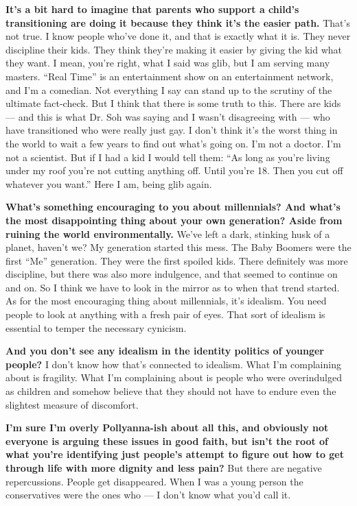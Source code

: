 \textbf{It's a bit hard to imagine that parents who support a child's
transitioning are doing it because they think it's the easier path.}
That's not true. I know people who've done it, and that is exactly what
it is. They never discipline their kids. They think they're making it
easier by giving the kid what they want. I mean, you're right, what I
said was glib, but I am serving many masters. ``Real Time'' is an
entertainment show on an entertainment network, and I'm a comedian. Not
everything I say can stand up to the scrutiny of the ultimate
fact-check. But I think that there is some truth to this. There are kids
--- and this is what Dr. Soh was saying and I wasn't disagreeing with
--- who have transitioned who were really just gay. I don't think it's
the worst thing in the world to wait a few years to find out what's
going on. I'm not a doctor. I'm not a scientist. But if I had a kid I
would tell them: ``As long as you're living under my roof you're not
cutting anything off. Until you're 18. Then you cut off whatever you
want.'' Here I am, being glib again.

\textbf{What's something encouraging to you about millennials? And
what's the most disappointing thing about your own generation? Aside
from ruining the world environmentally.} We've left a dark, stinking
husk of a planet, haven't we? My generation started this mess. The Baby
Boomers were the first ``Me'' generation. They were the first spoiled
kids. There definitely was more discipline, but there was also more
indulgence, and that seemed to continue on and on. So I think we have to
look in the mirror as to when that trend started. As for the most
encouraging thing about millennials, it's idealism. You need people to
look at anything with a fresh pair of eyes. That sort of idealism is
essential to temper the necessary cynicism.

\textbf{And you don't see any idealism in the identity politics of
younger people?} I don't know how that's connected to idealism. What I'm
complaining about is fragility. What I'm complaining about is people who
were overindulged as children and somehow believe that they should not
have to endure even the slightest measure of discomfort.

\textbf{I'm sure I'm overly Pollyanna-ish about all this, and obviously
not everyone is arguing these issues in good faith, but isn't the root
of what you're identifying just people's attempt to figure out how to
get through life with more dignity and less pain?} But there are
negative repercussions. People get disappeared. When I was a young
person the conservatives were the ones who --- I don't know what you'd
call it.

